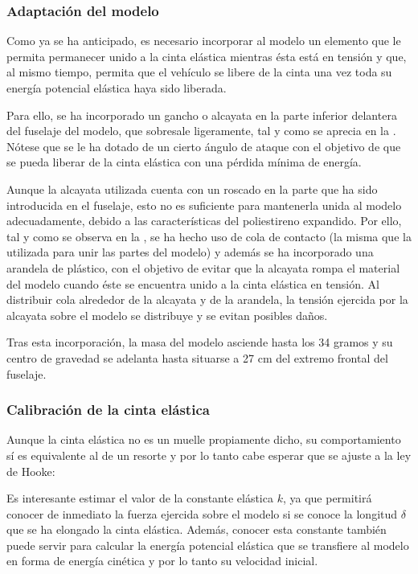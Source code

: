 \subsubsection{Adaptación del modelo}
\label{sec:tests:preparation:adaptation}

Como ya se ha anticipado, es necesario incorporar al modelo un elemento que le permita permanecer unido a la cinta elástica mientras ésta está en tensión y que, al mismo tiempo, permita que el vehículo se libere de la cinta una vez toda su energía potencial elástica haya sido liberada.

Para ello, se ha incorporado un gancho o alcayata en la parte inferior delantera del fuselaje del modelo, que sobresale ligeramente, tal y como se aprecia en la . Nótese que se le ha dotado de un cierto ángulo de ataque con el objetivo de que se pueda liberar de la cinta elástica con una pérdida mínima de energía.

Aunque la alcayata utilizada cuenta con un roscado en la parte que ha sido introducida en el fuselaje, esto no es suficiente para mantenerla unida al modelo adecuadamente, debido a las características del poliestireno expandido. Por ello, tal y como se observa en la , se ha hecho uso de cola de contacto (la misma que la utilizada para unir las partes del modelo) y además se ha incorporado una arandela de plástico, con el objetivo de evitar que la alcayata rompa el material del modelo cuando éste se encuentra unido a la cinta elástica en tensión. Al distribuir cola alrededor de la alcayata y de la arandela, la tensión ejercida por la alcayata sobre el modelo se distribuye y se evitan posibles daños.

Tras esta incorporación, la masa del modelo asciende hasta los 34 gramos y su centro de gravedad se adelanta hasta situarse a 27 cm del extremo frontal del fuselaje.


\subsubsection{Calibración de la cinta elástica}
\label{sec:tests:preparation:calibration}

Aunque la cinta elástica no es un muelle propiamente dicho, su comportamiento sí es equivalente al de un resorte y por lo tanto cabe esperar que se ajuste a la ley de Hooke:

Es interesante estimar el valor de la constante elástica $k$, ya que permitirá conocer de inmediato la fuerza ejercida sobre el modelo si se conoce la longitud $\delta$ que se ha elongado la cinta elástica. Además, conocer esta constante también puede servir para calcular la energía potencial elástica que se transfiere al modelo en forma de energía cinética y por lo tanto su velocidad inicial.

